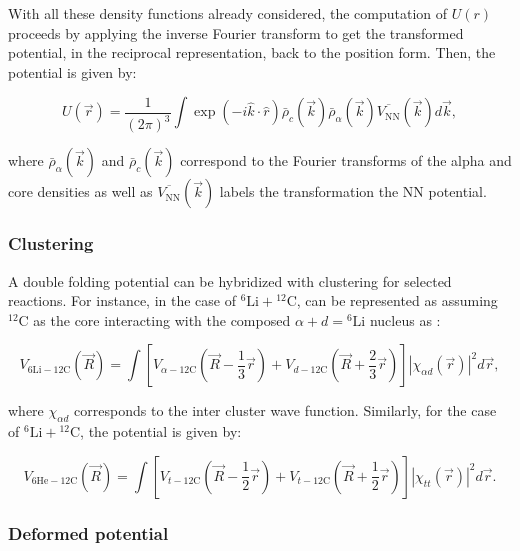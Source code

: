 \documentclass[openany]{book}
\begin{document}
With all these density functions already considered, the computation of $U(r)$ proceeds by applying the inverse Fourier transform to get the transformed potential, in the reciprocal representation, back to the position form. Then, the potential is given by:

\begin{equation}\label{eq:micro_doubleFolding_potential_Fourier}
	U(\vec r ) = \frac{1}{(2\pi)^3} \int { \exp{(-i\hat k \cdot \hat r )} \bar {\rho}_c(\vec k)  \bar {\rho}_\alpha (\vec k) \overline{V_{\mathrm{NN}}}(\vec k)  d\vec k},
\end{equation}

where $\bar {\rho}_\alpha (\vec k)$ and $\bar {\rho}_c(\vec k) $ correspond to the Fourier transforms of the alpha and core densities as well as $\overline{V_{\mathrm{NN}}}(\vec k)$ labels the transformation the $\mathrm{NN}$ potential.  \\

\subsubsection{Clustering}

A double folding potential can be hybridized with clustering for selected reactions. For instance, in the case of $\mathrm{{}^{6}Li + {}^{12}C}$, can be represented as assuming $\mathrm{{}^{12}C}$ as the core interacting with the composed $\alpha + d = \mathrm{{}^{6}Li}$ nucleus as \cite{amer_penionzhkevich_2021}:

\begin{equation}\label{eq:potential_cluster_6Li12C}
	V_{\mathrm{6Li-12C}}(\vec R) = \int \left[V_{\alpha-\mathrm{12C}} \left(\vec R - \frac{1}{3} \vec r\right) + V_{d-\mathrm{12C}}\left(\vec R + \frac{2}{3} \vec r \right) \right]  |\chi_{\alpha d} (\vec r)|^2 d\vec r,
\end{equation} 

where $\chi_{\alpha d}$ corresponds to the inter cluster wave function. Similarly, for the case of $\mathrm{{}^{6}Li + {}^{12}C}$, the potential is given by:


\begin{equation}\label{eq:potential_cluster_6He12C}
	V_{\mathrm{6He-12C}}(\vec R) = \int \left[V_{t-\mathrm{12C}} \left(\vec R - \frac{1}{2} \vec r\right) + V_{t-\mathrm{12C}}\left(\vec R + \frac{1}{2} \vec r\right)  \right] |\chi_{t t} (\vec r)|^2 d\vec r .
\end{equation} 

\subsubsection{Deformed potential}
\end{document}
